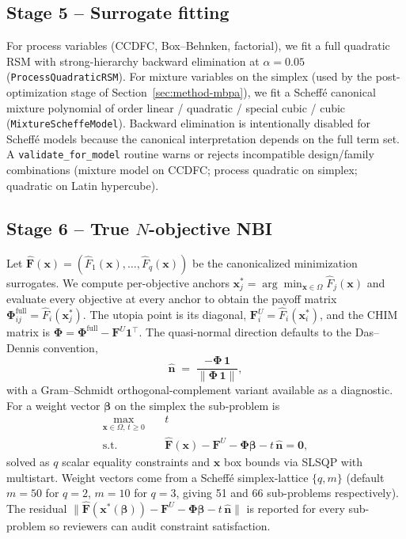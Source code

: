 \subsection{Stage 5 -- Surrogate fitting}
\label{sec:method-surrogate}
For process variables (CCDFC, Box--Behnken, factorial), we fit a
full quadratic RSM with strong-hierarchy backward elimination at
$\alpha{=}0.05$ (\texttt{ProcessQuadraticRSM}). For mixture variables
on the simplex (used by the post-optimization stage of
Section~\ref{sec:method-mbpa}), we fit a Scheff\'{e} canonical
mixture polynomial of order linear / quadratic / special cubic / cubic
(\texttt{MixtureScheffeModel}). Backward elimination is intentionally
disabled for Scheff\'{e} models because the canonical interpretation
depends on the full term set. A
\texttt{validate\_for\_model} routine warns or rejects incompatible
design/family combinations (mixture model on CCDFC; process quadratic
on simplex; quadratic on Latin hypercube).

\subsection{Stage 6 -- True $N$-objective NBI}
\label{sec:method-nbi}
Let $\hat{\bm F}(\bm x) = (\hat F_1(\bm x),\dots,\hat F_q(\bm x))$ be
the canonicalized minimization surrogates. We compute per-objective
anchors $\bm x^{*}_j = \arg\min_{\bm x\in\Omega} \hat F_j(\bm x)$ and
evaluate every objective at every anchor to obtain the payoff matrix
$\bm{\Phi}^{\text{full}}_{ij} = \hat F_i(\bm x^{*}_j)$. The utopia
point is its diagonal,
$\bm F^{U}_i = \hat F_i(\bm x^{*}_i)$, and the CHIM matrix is
$\bm{\Phi} = \bm{\Phi}^{\text{full}} - \bm F^{U}\bm{1}^{\top}$. The
quasi-normal direction defaults to the Das--Dennis convention,
\begin{equation}
  \hat{\bm n} \;=\; \dfrac{-\bm{\Phi}\,\bm{1}}{\|\bm{\Phi}\,\bm{1}\|},
  \label{eq:nhat}
\end{equation}
with a Gram--Schmidt orthogonal-complement variant available as a
diagnostic. For a weight vector $\bm\beta$ on the simplex the
sub-problem is
\begin{equation}
  \begin{aligned}
    \max_{\bm x \in \Omega,\, t \ge 0} \quad & t \\
    \text{s.t.}\quad & \hat{\bm F}(\bm x) - \bm F^{U}
       - \bm{\Phi}\bm\beta - t\,\hat{\bm n} = \bm 0,
  \end{aligned}
  \label{eq:nbi-subproblem}
\end{equation}
solved as $q$ scalar equality constraints and $\bm x$ box bounds via
SLSQP with multistart. Weight vectors come from a Scheff\'{e}
simplex-lattice $\{q,m\}$ (default $m{=}50$ for $q{=}2$, $m{=}10$ for
$q{=}3$, giving 51 and 66 sub-problems respectively). The residual
$\|\hat{\bm F}(\bm x^{*}(\bm\beta)) - \bm F^{U} - \bm{\Phi}\bm\beta -
t\,\hat{\bm n}\|$ is reported for every sub-problem so reviewers can
audit constraint satisfaction.

